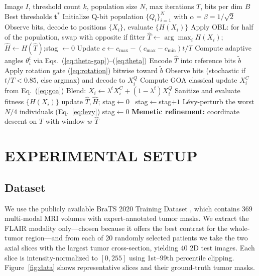 \begin{algorithm}[!t]
\caption{QIGOA for multilevel thresholding}\label{alg:qigoa}
\begin{algorithmic}[1]
\Require Image $I$, threshold count $k$, population size $N$, max iterations $T$, bits per dim $B$
\Ensure Best thresholds $\mathbf{t}^*$
\State Initialize Q-bit population $\{Q_i\}_{i=1}^{N}$ with $\alpha{=}\beta{=}1/\sqrt{2}$
\State Observe bits, decode to positions $\{X_i\}$, evaluate $\{H(X_i)\}$
\State Apply OBL: for half of the population, swap with opposite if fitter
\State $\hat{T}\gets\arg\max_i H(X_i)$;\;$\hat{H}\gets H(\hat{T})$;\;stag $\gets 0$
  \State Update $c\gets c_{\max}-(c_{\max}-c_{\min})t/T$
  \State Compute adaptive angles $\theta_i^t$ via Eqs.~(\ref{eq:theta-gap})--(\ref{eq:theta})
  \State Encode $\hat{T}$ into reference bits $\tilde{b}$
  \State Apply rotation gate (\ref{eq:rotation}) bitwise toward $\tilde{b}$
  \State Observe bits (stochastic if $t/T<0.85$, else argmax) and decode to $X_i^Q$
  \State Compute GOA classical update $X_i^C$ from Eq.~(\ref{eq:goa})
  \State Blend: $X_i \gets \lambda^t X_i^C + (1-\lambda^t) X_i^Q$
  \State Sanitize and evaluate fitness $\{H(X_i)\}$
   update $\hat{T},\hat{H}$; stag$\gets 0$
  \Else~stag$\gets$stag$+1$
  \EndIf
     \State L\'evy-perturb the worst $N/4$ individuals (Eq.~\ref{eq:levy})
     \State stag$\gets 0$
  \EndIf
\EndFor
\State \textbf{Memetic refinement:} coordinate descent on $\hat{T}$ with window $w$
\State \Return $\hat{T}$
\end{algorithmic}
\end{algorithm}

\section{EXPERIMENTAL SETUP}\label{sec:setup}

\subsection{Dataset}
We use the publicly available BraTS 2020 Training Dataset \cite{menze2014brats,bakas2017brats}, which contains 369 multi-modal MRI volumes with expert-annotated tumor masks. We extract the FLAIR modality only---chosen because it offers the best contrast for the whole-tumor region---and from each of 20 randomly selected patients we take the two axial slices with the largest tumor cross-section, yielding 40 2D test images. Each slice is intensity-normalized to $[0,255]$ using 1st--99th percentile clipping. Figure~\ref{fig:data} shows representative slices and their ground-truth tumor masks.


